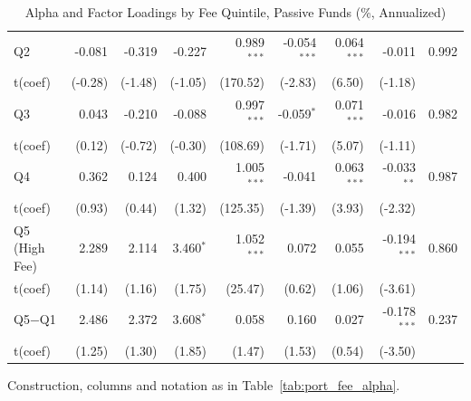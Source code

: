 \begin{table}[!htbp]
{\begin{tabular*}{\linewidth}{@{\extracolsep{\fill}}lrrrrrrrr}
\hspace{1em}Q2 & -0.081 & -0.319 & -0.227 & 0.989$^{***}$ & -0.054$^{***}$ & 0.064$^{***}$ & -0.011 & 0.992\\
\hspace{1em}t(coef) & (-0.28) & (-1.48) & (-1.05) & (170.52) & (-2.83) & (6.50) & (-1.18) & \\
\hspace{1em}Q3 & 0.043 & -0.210 & -0.088 & 0.997$^{***}$ & -0.059$^{*}$ & 0.071$^{***}$ & -0.016 & 0.982\\
\hspace{1em}t(coef) & (0.12) & (-0.72) & (-0.30) & (108.69) & (-1.71) & (5.07) & (-1.11) & \\
\hspace{1em}Q4 & 0.362 & 0.124 & 0.400 & 1.005$^{***}$ & -0.041 & 0.063$^{***}$ & -0.033$^{**}$ & 0.987\\
\hspace{1em}t(coef) & (0.93) & (0.44) & (1.32) & (125.35) & (-1.39) & (3.93) & (-2.32) & \\
\hspace{1em}Q5 (High Fee) & 2.289 & 2.114 & 3.460$^{*}$ & 1.052$^{***}$ & 0.072 & 0.055 & -0.194$^{***}$ & 0.860\\
\hspace{1em}t(coef) & (1.14) & (1.16) & (1.75) & (25.47) & (0.62) & (1.06) & (-3.61) & \\
\hspace{1em}Q5$-$Q1 & 2.486 & 2.372 & 3.608$^{*}$ & 0.058 & 0.160 & 0.027 & -0.178$^{***}$ & 0.237\\
\hspace{1em}t(coef) & (1.25) & (1.30) & (1.85) & (1.47) & (1.53) & (0.54) & (-3.50) & \\
\bottomrule
\end{tabular*}%
}\sbefit
\fi
\setlength{\tabletempwidth}{\wd\tabletempbox}
\ifdim\tabletempwidth>\linewidth\setlength{\tabletempwidth}{\linewidth}\fi
\begin{minipage}{\tabletempwidth}
\captionsetup{width=\linewidth}
\caption{Alpha and Factor Loadings by Fee Quintile, Passive Funds (\%, Annualized)}\label{tab:port_fee_alpha_passive}
\ifdim\wd\tabletempbox>\linewidth
  \resizebox{\linewidth}{!}{\usebox{\tabletempbox}}
\else
  \usebox{\tabletempbox}
\fi
\par\medskip
\begin{singlespace}\tablefont\noindent
Construction, columns and notation as in Table~\ref{tab:port_fee_alpha}.
\end{singlespace}
\end{minipage}
\end{table}

